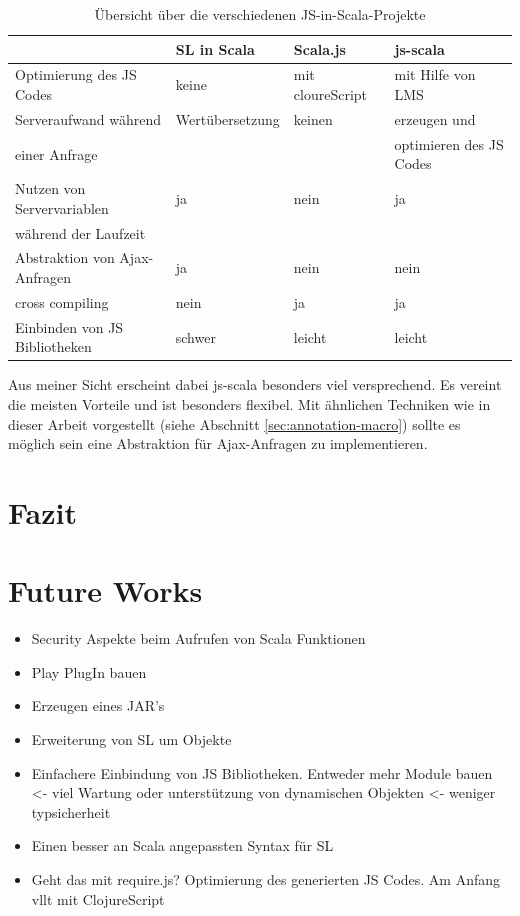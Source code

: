 \documentclass[12pt,bibtotoc]{scrreprt}
\begin{document}
\begin{table}[ht]
\caption{Übersicht über die verschiedenen JS-in-Scala-Projekte}
\centering
\begin{tabular}{llll}
      & SL in Scala &  Scala.js              &    js-scala \\
\midrule
Optimierung des JS Codes  &  keine  &  mit cloureScript & mit Hilfe von LMS\\
\addlinespace
Serveraufwand während & Wertübersetzung & keinen & erzeugen und  \\
einer Anfrage &  & & optimieren des JS Codes\\
\addlinespace
Nutzen von Servervariablen  & ja & nein & ja \\
während der Laufzeit & \\
\addlinespace
Abstraktion von Ajax-Anfragen & ja & nein & nein \\
\addlinespace
cross compiling & nein & ja & ja \\
\addlinespace
Einbinden von JS Bibliotheken & schwer & leicht & leicht \\

\end{tabular}
\label{tab:related-work-overview}
\end{table}

Aus meiner Sicht erscheint dabei js-scala besonders viel versprechend. Es vereint die meisten Vorteile und ist besonders flexibel. Mit ähnlichen Techniken wie in dieser Arbeit vorgestellt (siehe Abschnitt \ref{sec:annotation-macro}) sollte es möglich sein eine Abstraktion für Ajax-Anfragen zu implementieren.

\chapter{Fazit}
\label{chap:conclusion}

\appendix

\chapter{Future Works}
\label{sec:future-works}

\begin{itemize}
 \item{Security Aspekte beim Aufrufen von Scala Funktionen}
 \item{Play PlugIn bauen}
 \item{Erzeugen eines JAR's}
 \item{Erweiterung von SL um Objekte}
 \item{Einfachere Einbindung von JS Bibliotheken. Entweder mehr Module bauen <- viel Wartung oder unterstützung von dynamischen Objekten <- weniger typsicherheit}
 \item{Einen besser an Scala angepassten Syntax für SL}
 \item{Geht das mit require.js? Optimierung des generierten JS Codes. Am Anfang vllt mit ClojureScript}
\end{itemize}
\end{document}
